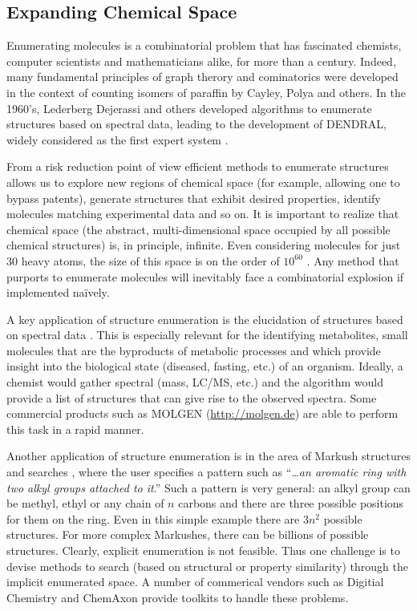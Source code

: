 \documentclass{sig-alternate}
\begin{document}
\subsection{Expanding Chemical Space}
\label{sec:struct-enum} 
Enumerating molecules is a combinatorial problem that has fascinated
chemists, computer scientists and mathematicians alike, for more than
a century. Indeed, many fundamental principles of graph therory and
cominatorics were developed in the context of counting isomers of
paraffin by Cayley, Polya and others. In the 1960's, Lederberg
Dejerassi and others developed algorithms to enumerate structures
based on spectral data, leading to the development of DENDRAL, widely
considered as the first expert system \cite{DENDRAL}.

From a risk reduction point of view efficient methods to enumerate
structures allows us to explore new regions of chemical space (for
example, allowing one to bypass patents), generate structures that
exhibit desired properties, identify molecules matching experimental
data and so on. It is important to realize that chemical space (the
abstract, multi-dimensional space occupied by all possible chemical
structures) is, in principle, infinite. Even considering molecules for
just 30 heavy atoms, the size of this space is on the order of
$10^{60}$ \cite{Bohacek:1996ve}. Any method that purports to enumerate
molecules will inevitably face a combinatorial explosion if
implemented na\"{i}vely.

A key application of structure enumeration is the elucidation of
structures based on spectral data \cite{Kind:2010zr}. This is
especially relevant for the identifying metabolites, small molecules
that are the byproducts of metabolic processes and which provide
insight into the biological state (diseased, fasting, etc.) of an
organism. Ideally, a chemist would gather spectral (mass, LC/MS, etc.)
and the algorithm would provide a list of structures that can give
rise to the observed spectra. Some commercial products such as MOLGEN
(\url{http://molgen.de}) are able to perform this task in a rapid
manner.

Another application of structure enumeration is in the area of Markush
structures and searches \cite{Barnard:1991vn}, where the user
specifies a pattern such as ``\emph{\ldots an aromatic ring with two
  alkyl groups attached to it}.'' Such a pattern is very general: an
alkyl group can be methyl, ethyl or any chain of $n$ carbons and there
are three possible positions for them on the ring. Even in this simple
example there are $3n^2$ possible structures. For more complex
Markushes, there can be billions of possible structures. Clearly,
explicit enumeration is not feasible. Thus one challenge is to devise
methods to search (based on structural or property similarity) through
the implicit enumerated space. A number of commerical vendors such as
Digitial Chemistry and ChemAxon provide toolkits to handle these
problems.
\end{document}
